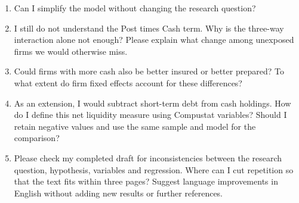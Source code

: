 \begin{enumerate}
\item Can I simplify the model without changing the research question?

\item I still do not understand the Post times Cash term. Why is the three-way
interaction alone not enough? Please explain what change among unexposed firms
we would otherwise miss.

\item Could firms with more cash also be better insured or better prepared?
To what extent do firm fixed effects account for these differences?

\item As an extension, I would subtract short-term debt from cash holdings.
How do I define this net liquidity measure using Compustat variables?
Should I retain negative values and use the same sample and model for the
comparison?

\item Please check my completed draft for inconsistencies between the research
question, hypothesis, variables and regression. Where can I cut repetition so
that the text fits within three pages? Suggest language improvements in English
without adding new results or further references.

\end{enumerate}
\clearpage
\endgroup
